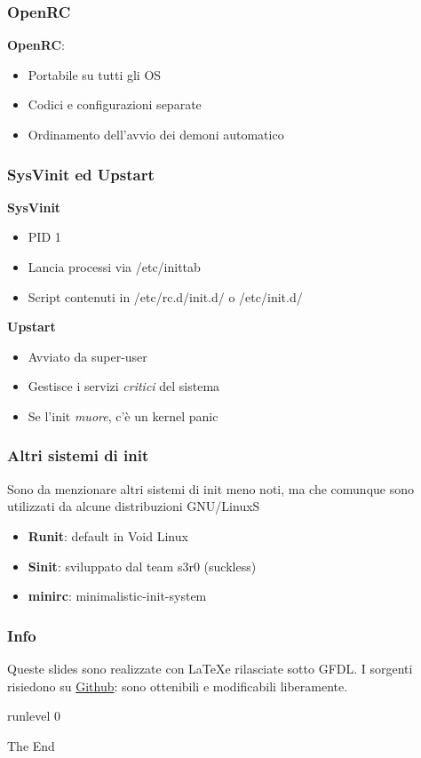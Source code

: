 \documentclass{beamer}
\begin{document}

\begin{frame}
	\frametitle{OpenRC}
	\textbf{OpenRC}:
	\begin{itemize}
		\item Portabile su tutti gli OS
		\item Codici e configurazioni separate
		\item Ordinamento dell'avvio dei demoni automatico
	\end{itemize}	 
\end{frame}

\begin{frame}
	\frametitle{SysVinit ed Upstart}
	\textbf{SysVinit}
	\begin{itemize}
		\item PID 1
		\item Lancia processi via /etc/inittab
		\item Script contenuti in /etc/rc.d/init.d/ o /etc/init.d/
	\end{itemize}	
\textbf{Upstart}
\begin{itemize}
	\item Avviato da super-user
	\item Gestisce i servizi \textit{critici} del sistema
	\item Se l'init \textit{muore}, c'\`e un kernel panic
\end{itemize}
\end{frame}

\begin{frame}
	\frametitle{Altri sistemi di init}
	Sono da menzionare altri sistemi di init meno noti, ma che comunque sono utilizzati da alcune distribuzioni GNU/LinuxS
	\begin{itemize}
		\item \textbf{Runit}: default in Void Linux
		\item \textbf{Sinit}: sviluppato dal team s3r0 (suckless)
		\item \textbf{minirc}: minimalistic-init-system
	\end{itemize}
\end{frame}
\begin{frame}
	\frametitle{Info}
	Queste slides sono realizzate con \LaTeX  e rilasciate sotto GFDL.
	I sorgenti risiedono su \href{https://github.com/smlb/LinuxDay2014-smlb}{Github}: sono ottenibili e modificabili liberamente.
\end{frame}
\begin{frame}
\Huge{\centerline{runlevel 0}}
\huge{\centerline{The End}}
\end{frame}

\end{document}
